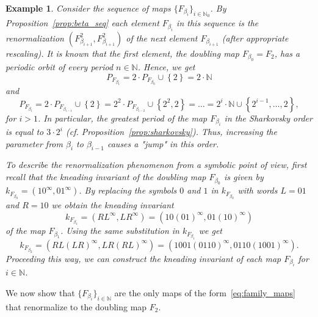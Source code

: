 \documentclass[10pt,reqno]{amsart}
\theoremstyle{plain}
\theoremstyle{assumption}
\theoremstyle{notation}
\theoremstyle{claim}
\theoremstyle{conj}
\theoremstyle{theorem}
\theoremstyle{proposition}
\theoremstyle{corollary}
\newtheorem{example}[theorem]{Example}
\begin{document}
\begin{example}
    Consider the sequence of maps $\{F_{\beta_i}\}_{i\in\mathbb{N}_0}$. By Proposition~\ref{prop:beta_seq} each element $F_{\beta_i}$ in this sequence is the renormalization $(F_{\beta_{i+1}}^2,F_{\beta_{i+1}}^2)$ of the next element $F_{\beta_{i+1}}$ (after appropriate rescaling). It is known that the first element, the doubling map $F_{\beta_0}=F_2$, has a periodic orbit of every period $n\in\mathbb{N}$. Hence, we get
    $$
    P_{F_{\beta_1}}=2\cdot P_{F_{\beta_0}}\cup\left\lbrace2\right\rbrace=2\cdot\mathbb{N}
    $$
    and
     \begin{equation*}
	P_{F_{\beta_i}}=2\cdot P_{F_{\beta_{i-1}}}\cup\left\lbrace2\right\rbrace=2^2\cdot P_{F_{\beta_{i-2}}}\cup\left\lbrace2^2,2\right\rbrace=\ldots
	=2^{i}\cdot\mathbb{N}\cup\left\lbrace2^{i-1},\ldots,2\right\rbrace,
\end{equation*}
for $i>1$. In particular, the greatest period of the map $F_{\beta_i}$ in the Sharkovsky order is equal to $3\cdot2^{i}$ (cf. Proposition~\ref{prop:sharkovsky}). Thus, increasing the parameter from $\beta_i$ to $\beta_{i-1}$ causes a "jump" in this order.

To describe the renormalization phenomenon from a symbolic point of view, first recall that the kneading invariant of the doubling map $F_{\beta_0}$ is given by $k_{F_{\beta_0}}=(10^\infty,01^\infty)$. By replacing the symbols $0$ and $1$ in $k_{F_{\beta_0}}$ with words $L=01$ and $R=10$ we obtain the kneading invariant 
$$
k_{F_{\beta_1}}=(RL^\infty,LR^\infty)=(10(01)^\infty,01(10)^\infty)
$$
of the map $F_{\beta_1}$. Using the same substitution in $k_{F_{\beta_1}}$ we get
$$
k_{F_{\beta_2}}=(RL(LR)^\infty,LR(RL)^\infty)=(1001(0110)^\infty,0110(1001)^\infty).
$$
Proceeding this way, we can construct the kneading invariant of each map $F_{\beta_i}$ for $i\in\mathbb{N}$.
\end{example}

We now show that $\{F_{\beta_i}\}_{i\in\mathbb{N}}$ are the only maps of the form~\eqref{eq:family_maps} that renormalize to the doubling map $F_2$. 
\end{document}
